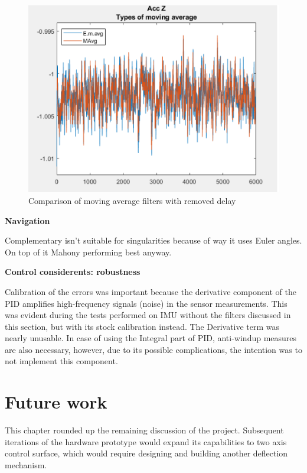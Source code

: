 \begin{figure}[H]
  \centering
  \includegraphics[scale=0.9]{graphics/accznodelay.png}
  \caption{Comparison of moving average filters with removed delay}
  \label{movingaveragenodelay}
\end{figure}

\textbf{Navigation}

Complementary isn't suitable for singularities because of way it uses Euler angles. On top of it Mahony performing best anyway. 


\textbf{Control considerents: robustness}

Calibration of the errors was important because the derivative component of the PID amplifies high-frequency signals (noise) in the sensor measurements.
This was evident during the tests performed on IMU without the filters discussed in this section, but with its stock calibration instead. The Derivative term was nearly unusable. 
In case of using the Integral part of PID, anti-windup measures are also necessary, however, due to its possible complications, the intention was to not implement this component. 



\section{Future work}

This chapter rounded up the remaining discussion of the project.
Subsequent iterations of the hardware prototype would expand its capabilities to two axis control surface, which would require designing and building another deflection mechanism.


